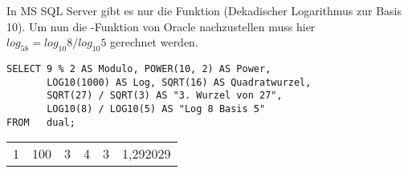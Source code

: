        In MS SQL Server gibt es nur die Funktion 
        (Dekadischer Logarithmus zur Basis 10). Um nun die
        -Funktion von Oracle nachzustellen muss hier $log_58
        = log_{10}8 / log_{10}5$ gerechnet werden.
        \begin{lstlisting}[language=ms_sql,caption={H\"ohere Rechenarten in MS SQL Server},label=sql03_18]
SELECT 9 % 2 AS Modulo, POWER(10, 2) AS Power,
       LOG10(1000) AS Log, SQRT(16) AS Quadratwurzel,
       SQRT(27) / SQRT(3) AS "3. Wurzel von 27",
       LOG10(8) / LOG10(5) AS "Log 8 Basis 5"
FROM   dual;
        \end{lstlisting}
        \begin{center}
          \begin{small}
            \tablehead{}
            \begin{mssql}
              \begin{supertabular}{llllll}
                1 & 100 & 3 & 4 & 3 & 1,292029 \\
              \end{supertabular}
            \end{mssql}
          \end{small}
        \end{center}
        \begin{literaturinternet}
          \item \cite{i97801}
          \item \cite{i77449}
          \item \cite{i84140}
          \item \cite{i77996}
          \item \cite{i78493}
          \item \cite{i78633}
          \item \cite{ms189818}
          \item \cite{ms178531}
          \item \cite{ms175121}
          \item \cite{ms174276}
          \item \cite{ms175003}
        \end{literaturinternet}
